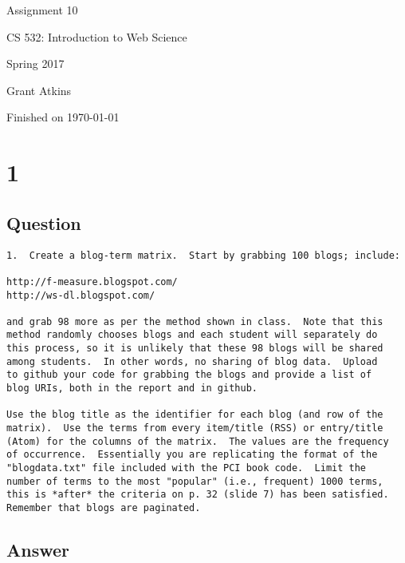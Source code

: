 \documentclass[letterpaper,11pt]{article}
\begin{document}
\begin{titlepage}

\begin{center}

\Huge{Assignment 10}

\Large{CS 532:  Introduction to Web Science}

\Large{Spring 2017}

\Large{Grant Atkins}

\Large Finished on \today

\end{center}

\end{titlepage}

\newpage


\section*{1}

\subsection*{Question}

\begin{verbatim}
1.  Create a blog-term matrix.  Start by grabbing 100 blogs; include:

http://f-measure.blogspot.com/
http://ws-dl.blogspot.com/

and grab 98 more as per the method shown in class.  Note that this
method randomly chooses blogs and each student will separately do
this process, so it is unlikely that these 98 blogs will be shared
among students.  In other words, no sharing of blog data.  Upload
to github your code for grabbing the blogs and provide a list of
blog URIs, both in the report and in github.

Use the blog title as the identifier for each blog (and row of the
matrix).  Use the terms from every item/title (RSS) or entry/title
(Atom) for the columns of the matrix.  The values are the frequency
of occurrence.  Essentially you are replicating the format of the
"blogdata.txt" file included with the PCI book code.  Limit the
number of terms to the most "popular" (i.e., frequent) 1000 terms,
this is *after* the criteria on p. 32 (slide 7) has been satisfied.
Remember that blogs are paginated. 
\end{verbatim}

\clearpage
\subsection*{Answer}
\end{document}
